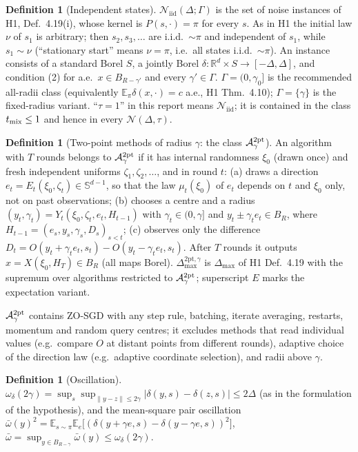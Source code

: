 \documentclass[11pt,a4paper]{article}
\numberwithin{equation}{section}
\theoremstyle{definition}
\newtheorem{definition}[theorem]{Definition}
\theoremstyle{remark}
\newcommand{\E}{\mathbb E}\newcommand{\R}{\mathbb R}\newcommand{\Z}{\mathbb Z}\newcommand{\Prob}{\mathbb P}
\newcommand{\norm}[1]{\lVert #1\rVert}\newcommand{\abs}[1]{\lvert #1\rvert}\newcommand{\ip}[2]{\langle #1,#2\rangle}
\newcommand{\Dmax}{\Delta_{\max}}\newcommand{\Dcp}{\Delta_{\rm cp}}\newcommand{\Dlow}{\Delta_{\rm low}}
\newcommand{\cN}{\mathcal N}\newcommand{\cA}{\mathcal A}\newcommand{\cG}{\mathcal G}\newcommand{\cF}{\mathcal F}
\newcommand{\Sph}{\mathbb S^{d-1}}\newcommand{\Ball}{\mathbb B}\newcommand{\iid}{\mathrm{iid}}
\newcommand{\wbar}{\bar\omega}\newcommand{\Atwo}{\cA^{\rm 2pt}_\gamma}
\begin{document}
\begin{definition}[Independent states]\label{def:iid}
$\cN_\iid(\Delta;\Gamma)$ is the set of noise instances of H1, Def.~4.19(i), whose kernel is $P(s,\cdot)=\pi$ for every $s$. As in H1 the initial law $\nu$ of $s_1$ is arbitrary; then $s_2,s_3,\dots$ are i.i.d.\ $\sim\pi$ and independent of $s_1$, while $s_1\sim\nu$ (``stationary start'' means $\nu=\pi$, i.e.\ all states i.i.d.\ $\sim\pi$). An instance consists of a standard Borel $S$, a jointly Borel $\delta:\R^d\times S\to[-\Delta,\Delta]$, and condition (2) for a.e.\ $x\in B_{R-\gamma'}$ and every $\gamma'\in\Gamma$. $\Gamma=(0,\gamma_0]$ is the recommended all-radii class (equivalently $\E_\pi\delta(x,\cdot)=c$ a.e., H1 Thm.~4.10); $\Gamma=\{\gamma\}$ is the fixed-radius variant. ``$\tau=1$'' in this report means $\cN_\iid$; it is contained in the class $t_{\rm mix}\le1$ and hence in every $\cN(\Delta,\tau)$.
\end{definition}

\begin{definition}[Two-point methods of radius $\gamma$: the class $\Atwo$]\label{def:class}
An algorithm with $T$ rounds belongs to $\Atwo$ if it has internal randomness $\xi_0$ (drawn once) and fresh independent uniforms $\zeta_1,\zeta_2,\dots$, and in round $t$:
(a) draws a direction $e_t=E_t(\xi_0,\zeta_t)\in\Sph$, so that the law $\mu_t(\xi_0)$ of $e_t$ depends on $t$ and $\xi_0$ only, not on past observations;
(b) chooses a centre and a radius $(y_t,\gamma_t)=Y_t(\xi_0,\zeta_t,e_t,H_{t-1})$ with $\gamma_t\in(0,\gamma]$ and $y_t\pm\gamma_te_t\in B_R$, where $H_{t-1}=(e_s,y_s,\gamma_s,D_s)_{s<t}$;
(c) observes only the difference $D_t=O(y_t+\gamma_te_t,s_t)-O(y_t-\gamma_te_t,s_t)$.
After $T$ rounds it outputs $\hat x=X(\xi_0,H_T)\in B_R$ (all maps Borel). $\Dmax^{\mathrm{2pt},\gamma}$ is $\Dmax$ of H1 Def.~4.19 with the supremum over algorithms restricted to $\Atwo$; superscript $E$ marks the expectation variant.
\end{definition}
$\Atwo$ contains ZO-SGD with any step rule, batching, iterate averaging, restarts, momentum and random query centres; it excludes methods that read individual values (e.g.\ compare $O$ at distant points from different rounds), adaptive choice of the direction law (e.g.\ adaptive coordinate selection), and radii above $\gamma$.

\begin{definition}[Oscillation]\label{def:osc}
$\omega_\delta(2\gamma)=\sup_s\sup_{\norm{y-z}\le2\gamma}\abs{\delta(y,s)-\delta(z,s)}\le2\Delta$ (as in the formulation of the hypothesis), and the mean-square pair oscillation $\wbar(y)^2=\E_{s\sim\pi}\E_e\big[(\delta(y+\gamma e,s)-\delta(y-\gamma e,s))^2\big]$, $\wbar=\sup_{y\in B_{R-\gamma}}\wbar(y)\le\omega_\delta(2\gamma)$.
\end{definition}
\end{document}
